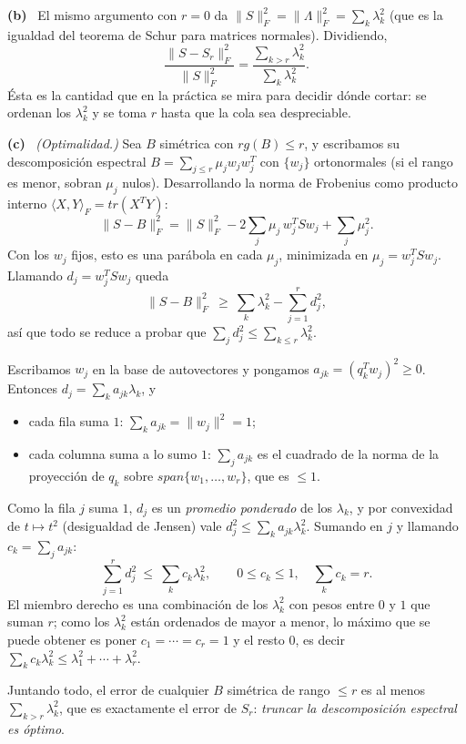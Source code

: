 \documentclass[11pt,a4paper]{article}
\newcommand{\bi}[1]{\boldsymbol{#1}}
\newcommand{\n}[1]{\boldsymbol{#1}}
\DeclareMathOperator{\gen}{span}
\DeclareMathOperator{\tr}{tr}
\DeclareMathOperator{\rg}{rg}
\def\n#1{#1}\def\bi#1{#1}\def\rg{rg}\def\tr{tr}\def\gen{span}%
\newcommand{\itemsol}[1]{\par\medskip\noindent\textbf{(#1)}\ \ignorespaces}
\begin{document}
\itemsol{b} El mismo argumento con $r=0$ da
$\|S\|_F^2=\|\Lambda\|_F^2=\sum_k\lambda_k^2$ (que es la igualdad del teorema de
Schur para matrices normales). Dividiendo,
\[
\frac{\|S-S_r\|_F^{2}}{\|S\|_F^{2}}
=\frac{\sum_{k>r}\lambda_k^{2}}{\sum_{k}\lambda_k^{2}} .
\]
Ésta es la cantidad que en la práctica se mira para decidir dónde cortar: se
ordenan los $\lambda_k^2$ y se toma $r$ hasta que la cola sea despreciable.

\itemsol{c} \emph{(Optimalidad.)} Sea $B$ simétrica con $\rg(B)\le r$, y
escribamos su descomposición espectral $B=\sum_{j\le r}\mu_j\n w_j\n w_j^T$ con
$\{\n w_j\}$ ortonormales (si el rango es menor, sobran $\mu_j$ nulos).
Desarrollando la norma de Frobenius como producto interno
$\langle X,Y\rangle_F=\tr(X^TY)$:
\[
\|S-B\|_F^{2}=\|S\|_F^{2}-2\sum_j\mu_j\,\n w_j^{T}S\n w_j+\sum_j\mu_j^{2}.
\]
Con los $\n w_j$ fijos, esto es una parábola en cada $\mu_j$, minimizada en
$\mu_j=\n w_j^TS\n w_j$. Llamando $d_j=\n w_j^TS\n w_j$ queda
\[
\|S-B\|_F^{2}\ \ge\ \sum_k\lambda_k^{2}-\sum_{j=1}^{r}d_j^{2},
\]
así que todo se reduce a probar que
$\sum_j d_j^2\le\sum_{k\le r}\lambda_k^2$.

Escribamos $\n w_j$ en la base de autovectores y pongamos
$a_{jk}=(q_k^T\n w_j)^2\ge0$. Entonces $d_j=\sum_k a_{jk}\lambda_k$, y
\begin{itemize}[itemsep=2pt,topsep=3pt]
\item cada fila suma $1$: $\sum_k a_{jk}=\|\n w_j\|^2=1$;
\item cada columna suma a lo sumo $1$: $\sum_j a_{jk}$ es el cuadrado de la norma
de la proyección de $q_k$ sobre $\gen\{\n w_1,\dots,\n w_r\}$, que es $\le1$.
\end{itemize}
Como la fila $j$ suma $1$, $d_j$ es un \emph{promedio ponderado} de los
$\lambda_k$, y por convexidad de $t\mapsto t^2$ (desigualdad de Jensen) vale
$d_j^2\le\sum_k a_{jk}\lambda_k^2$. Sumando en $j$ y llamando $c_k=\sum_j a_{jk}$:
\[
\sum_{j=1}^{r}d_j^{2}\ \le\ \sum_k c_k\lambda_k^{2},
\qquad 0\le c_k\le1,\quad \sum_k c_k=r .
\]
El miembro derecho es una combinación de los $\lambda_k^2$ con pesos entre $0$ y
$1$ que suman $r$; como los $\lambda_k^2$ están ordenados de mayor a menor, lo
máximo que se puede obtener es poner $c_1=\cdots=c_r=1$ y el resto $0$, es decir
$\sum_kc_k\lambda_k^2\le\lambda_1^2+\cdots+\lambda_r^2$.

Juntando todo, el error de cualquier $B$ simétrica de rango $\le r$ es al menos
$\sum_{k>r}\lambda_k^2$, que es exactamente el error de $S_r$: \emph{truncar la
descomposición espectral es óptimo}.
\end{document}
